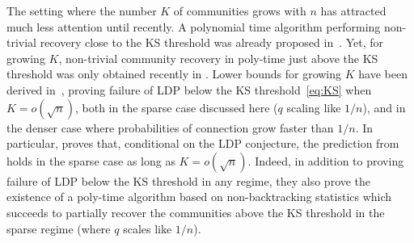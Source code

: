 \documentclass[final]{colt2026}
\newcommand{\1}{\mathbf{1}}
\begin{document}
The setting where the number $K$ of communities grows with $n$ has attracted much less attention until recently. A polynomial time algorithm performing non-trivial recovery close to the KS threshold was already proposed in~\cite{chen2014statistical}. Yet, for growing $K$, non-trivial community recovery in poly-time  just above the    KS threshold  was only obtained recently in \cite{stephan2024community,pmlr-v291-chin25a}. 
Lower bounds for growing $K$ have been derived in~\cite{luo2023computational, ding2025low,pmlr-v291-chin25a}, proving failure of LDP below the KS threshold~\eqref{eq:KS} when $K=o(\sqrt{n})$, both in  the sparse case discussed here ($q$ scaling like $1/n$), and in the denser case where probabilities of connection  grow faster than $1/n$. In particular, \cite{pmlr-v291-chin25a} proves that, conditional on the LDP conjecture, the prediction from \cite{Decelle2011} holds in the sparse case as long as $K=o(\sqrt{n})$. Indeed, in addition to proving  failure of LDP below the KS threshold in any regime, they also prove the existence of a poly-time algorithm based on non-backtracking statistics which succeeds to partially recover the communities above the KS threshold in the sparse regime (where $q$ scales like $1/n$).
\end{document}

